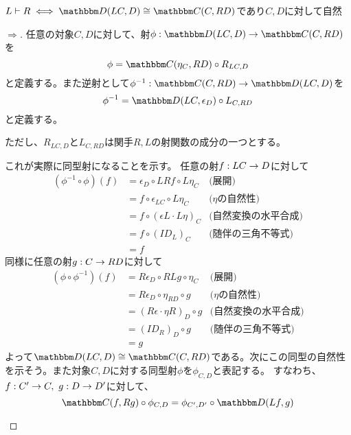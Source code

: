 \begin{prop}[随伴関手の同値な定義]\label{prop-equivalent-definition-of-adjoint-functors}
  $L\vdash R\iff \arset{D}{LC}{D}\cong\arset{C}{C}{RD}$であり$C,D$に対して自然
\end{prop}
\begin{proof}[$\Longrightarrow$]
  任意の対象$C,D$に対して、射$\mor{\phi}{\arset{D}{LC}{D}}{\arset{C}{C}{RD}}$を
  \[\phi = \arset{C}{\eta_C}{RD}\circ R_{LC,D}\]
  と定義する。また逆射として$\mor{\phi^{-1}}{\arset{C}{C}{RD}}{\arset{D}{LC}{D}}$を
  \[\phi^{-1}=\arset{D}{LC}{\epsilon_D}\circ L_{C,RD}\]と定義する。
  \begin{center}
  \end{center}
  ただし、$R_{LC,D}$と$L_{C,RD}$は関手$R,L$の射関数の成分の一つとする。

  これが実際に同型射になることを示す。
  任意の射$f:LC\rightarrow D$に対して
  \begin{align*}
    (\phi^{-1}\circ\phi)(f)&=\epsilon_D\circ LRf\circ L\eta_C&\text{(展開)}\\
    &=f\circ \epsilon_{LC}\circ L\eta_C&\text{($\eta$の自然性)}\\
    &=f\circ(\epsilon L\cdot L\eta)_C&\text{(自然変換の水平合成)}\\
    &=f\circ(ID_L)_C&\text{(随伴の三角不等式)}\\
    &=f
  \end{align*}
  同様に任意の射$g:C\rightarrow RD$に対して
  \begin{align*}
    (\phi\circ\phi^{-1})(f)
    &=R\epsilon_D\circ RLg \circ\eta_C&\text{(展開)}\\
    &=R\epsilon_D\circ\eta_{RD}\circ g&\text{($\eta$の自然性)}\\
    &=(R\epsilon\cdot\eta R)_D\circ g&\text{(自然変換の水平合成)}\\
    &=(ID_R)_D\circ g&\text{(随伴の三角不等式)}\\
    &=g
  \end{align*}
  よって$\arset{D}{LC}{D}\cong\arset{C}{C}{RD}$である。次にこの同型の自然性を示そう。また対象$C,D$に対する同型射$\phi$を$\phi_{C,D}$と表記する。
  すなわち、$\mor{f}{C'}{C},\ \mor{g}{D}{D'}$に対して、\[\arset{C}{f}{Rg}\circ\phi_{C,D}=\phi_{C',D'}\circ\arset{D}{Lf}{g}\]
  \begin{center}
\end{center}
\end{proof}

